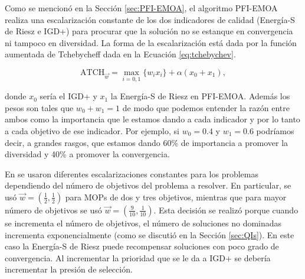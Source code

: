 Como se mencionó en la Sección \ref{sec:PFI-EMOA}, el algoritmo PFI-EMOA \cite{PFI} realiza una escalarización constante de los dos indicadores de calidad (Energía-S de Riesz e IGD+) para procurar que la solución no se estanque en convergencia ni tampoco en diversidad. La forma de la escalarización está dada por la función aumentada de Tchebycheff dada en la Ecuación \ref{eq:tchebychev}.

\begin{equation} \label{eq:ATCH2}
    \text{ATCH}_{\vec{w}}=\max_{i=0,1} \{w_ix_i\}+\alpha (x_0+x_1),  
\end{equation}

donde $x_0$ sería el IGD+ y $x_1$ la Energía-S de Riesz en PFI-EMOA. Además los pesos son tales que $ w_0+w_1=1$ de modo que podemos entender la razón entre ambos como la importancia que le estamos dando a cada indicador y por lo tanto a cada objetivo de ese indicador. Por ejemplo, si $w_0=0.4$ y $w_1=0.6$ podríamos decir, a grandes rasgos, que estamos dando 60\% de importancia a promover la diversidad y 40\% a promover la convergencia.   

En \cite{PFI} se usaron diferentes escalarizaciones constantes para los problemas dependiendo del número de objetivos del problema a resolver. En particular, se usó $\vec{w}=(\frac{1}{2},\frac{1}{2})$ para MOPs de dos y tres objetivos, mientras que para mayor número de objetivos se usó $\vec{w}=(\frac{9}{10},\frac{1}{10})$. Esta decisión se realizó porque cuando se incrementa el número de objetivos, el número de soluciones no dominadas incrementa exponencialmente (como se discutió en la Sección \ref{sec:QIs}). En este caso la Energía-S de Riesz puede recompensar soluciones con poco grado de convergencia. Al incrementar la prioridad que se le da a IGD+ se debería incrementar la presión de selección. 

